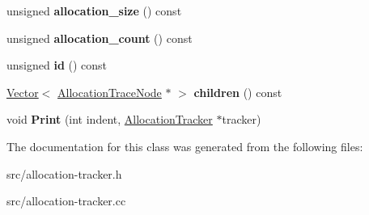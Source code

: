 \begin{DoxyCompactItemize}
\item 
\hypertarget{classv8_1_1internal_1_1_allocation_trace_node_aaecc079598de291e9411b0b1143338bb}{}unsigned {\bfseries allocation\+\_\+size} () const \label{classv8_1_1internal_1_1_allocation_trace_node_aaecc079598de291e9411b0b1143338bb}

\item 
\hypertarget{classv8_1_1internal_1_1_allocation_trace_node_a2a31df2800608396686f67576477c648}{}unsigned {\bfseries allocation\+\_\+count} () const \label{classv8_1_1internal_1_1_allocation_trace_node_a2a31df2800608396686f67576477c648}

\item 
\hypertarget{classv8_1_1internal_1_1_allocation_trace_node_a9f11563e9cbd3d46a0bd9eee2d8e0f3c}{}unsigned {\bfseries id} () const \label{classv8_1_1internal_1_1_allocation_trace_node_a9f11563e9cbd3d46a0bd9eee2d8e0f3c}

\item 
\hypertarget{classv8_1_1internal_1_1_allocation_trace_node_a81a9b60b273378fff6eee02960e44bea}{}\hyperlink{classv8_1_1internal_1_1_vector}{Vector}$<$ \hyperlink{classv8_1_1internal_1_1_allocation_trace_node}{Allocation\+Trace\+Node} $\ast$ $>$ {\bfseries children} () const \label{classv8_1_1internal_1_1_allocation_trace_node_a81a9b60b273378fff6eee02960e44bea}

\item 
\hypertarget{classv8_1_1internal_1_1_allocation_trace_node_acfba1229f80910c5746758f8afdff7af}{}void {\bfseries Print} (int indent, \hyperlink{classv8_1_1internal_1_1_allocation_tracker}{Allocation\+Tracker} $\ast$tracker)\label{classv8_1_1internal_1_1_allocation_trace_node_acfba1229f80910c5746758f8afdff7af}

\end{DoxyCompactItemize}


The documentation for this class was generated from the following files\+:\begin{DoxyCompactItemize}
\item 
src/allocation-\/tracker.\+h\item 
src/allocation-\/tracker.\+cc\end{DoxyCompactItemize}
